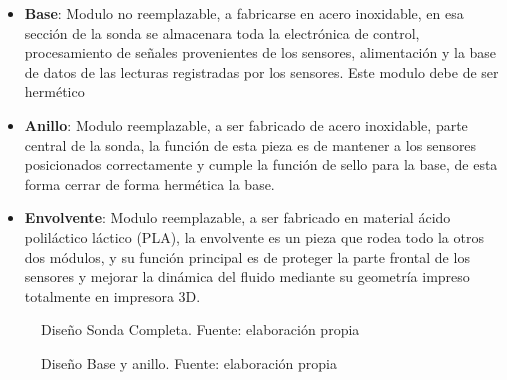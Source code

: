 \begin{itemize}
\item \textbf{Base}: Modulo no reemplazable, a fabricarse en acero inoxidable, en esa sección de la sonda se almacenara toda la electrónica de control, procesamiento de señales provenientes de los sensores, alimentación y la base de datos de las lecturas registradas por los sensores. Este modulo debe de ser hermético 

\item \textbf{Anillo}: Modulo reemplazable, a ser fabricado de acero inoxidable, parte central de la sonda, la función de esta pieza es de mantener a los sensores posicionados correctamente y cumple la función de sello para la base, de esta forma cerrar de forma hermética la base.

\item \textbf{Envolvente}: Modulo reemplazable, a ser fabricado en material ácido poliláctico  láctico (PLA), la envolvente es un pieza que rodea todo la otros dos módulos, y su función principal es de proteger la parte frontal de los sensores y mejorar la dinámica del fluido mediante su geometría impreso totalmente en impresora 3D.  

\end{itemize}

\begin{figure}[h]
\caption{Dise\~no Sonda Completa. Fuente: elaboración propia}
\label{fig:SondaV5}
\end{figure}

\begin{figure}[h]
\caption{Dise\~no Base y anillo. Fuente: elaboración propia}
\label{fig:SondaV5}
\end{figure}


